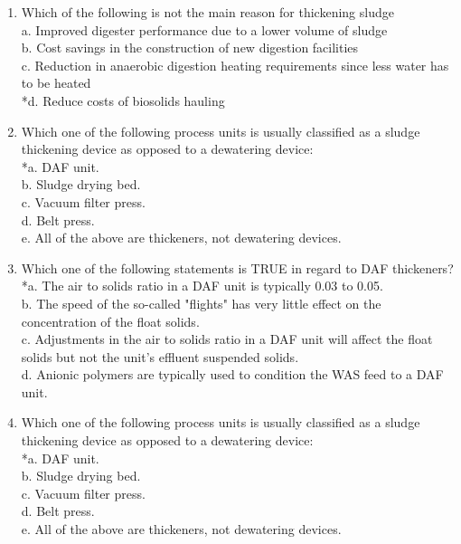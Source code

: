 \documentclass{article}
\begin{document}
\begin{enumerate}
\item  Which of the following is not the main reason for thickening sludge \\

a. Improved digester performance due to a lower volume of sludge \\
b. Cost savings in the construction of new digestion facilities \\
c. Reduction in anaerobic digestion heating requirements since less water has to be heated \\
*d. Reduce costs of biosolids hauling \\

\item  Which one of the following process units is usually classified as a sludge thickening device as opposed to a dewatering device: \\

*a. DAF unit. \\
b. Sludge drying bed. \\
c. Vacuum filter press. \\
d. Belt press. \\
e. All of the above are thickeners, not dewatering devices. \\

\item  Which one of the following statements is TRUE in regard to DAF thickeners? \\

*a. The air to solids ratio in a DAF unit is typically 0.03 to 0.05. \\
b. The speed of the so-called "flights" has very little effect on the concentration of the float solids. \\
c. Adjustments in the air to solids ratio in a DAF unit will affect the float solids but not the unit's effluent suspended solids. \\
d. Anionic polymers are typically used to condition the WAS feed to a DAF unit. \\

\item  Which one of the following process units is usually classified as a sludge thickening device as opposed to a dewatering device: \\

*a. DAF unit. \\
b. Sludge drying bed. \\
c. Vacuum filter press. \\
d. Belt press. \\
e. All of the above are thickeners, not dewatering devices. \\


\end{enumerate}
\end{document}
